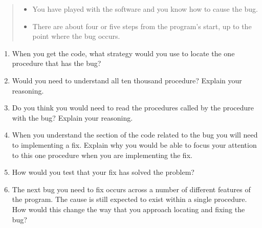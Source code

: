 \begin{enumerate}
\begin{quote}
\begin{itemize}
      \item You have played with the software and you know how to cause the bug.
      \item There are about four or five steps from the program's start, up to the point where the bug occurs.    
    \end{itemize}
  \end{quote}
  \begin{enumerate}
    \item When you get the code, what strategy would you use to locate the one procedure that has the bug?
    \item Would you need to understand all ten thousand procedure? Explain your reasoning.
    \item Do you think you would need to read the procedures called by the procedure with the bug? Explain your reasoning.
    \item When you understand the section of the code related to the bug you will need to implementing a fix. Explain why you would be able to focus your attention to this one procedure when you are implementing the fix.
    \item How would you test that your fix has solved the problem?
    \item The next bug you need to fix occurs across a number of different features of the program. The cause is still expected to exist within a single procedure. How would this change the way that you approach locating and fixing the bug?
  \end{enumerate}
  
\end{enumerate}

